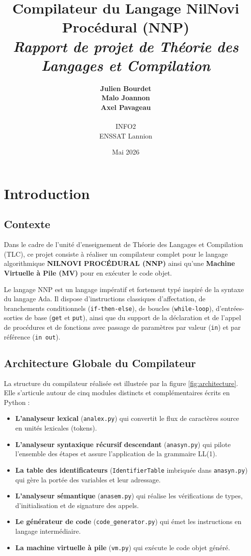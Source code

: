 \documentclass[a4paper, 12pt]{article}
\title{
    \vspace{2cm}
    \Huge\color{navyblue}\textbf{Compilateur du Langage NilNovi Procédural (NNP)}\\
    \vspace{0.5cm}
    \large\color{charcoal}\textit{Rapport de projet de Théorie des Langages et Compilation}\\
    \vspace{1.5cm}
}
\author{
    \textbf{Julien Bourdet}\\
    \textbf{Malo Joannon}\\
    \textbf{Axel Pavageau} \\
    \vspace{1cm}\\
    \color{charcoal}INFO2\\
    \color{charcoal}ENSSAT Lannion\\
}
\date{Mai 2026}
\begin{document}
\maketitle
\thispagestyle{empty}
\newpage

\tableofcontents
\newpage

\section{Introduction}

\subsection{Contexte}
Dans le cadre de l'unité d'enseignement de Théorie des Langages et Compilation (TLC), ce projet consiste à réaliser un compilateur complet pour le langage algorithmique \textbf{NILNOVI PROCÉDURAL (NNP)} ainsi qu'une \textbf{Machine Virtuelle à Pile (MV)} pour en exécuter le code objet. 

Le langage NNP est un langage impératif et fortement typé inspiré de la syntaxe du langage Ada. Il dispose d'instructions classiques d'affectation, de branchements conditionnels (\texttt{if-then-else}), de boucles (\texttt{while-loop}), d'entrées-sorties de base (\texttt{get} et \texttt{put}), ainsi que du support de la déclaration et de l'appel de procédures et de fonctions avec passage de paramètres par valeur (\texttt{in}) et par référence (\texttt{in out}).

\subsection{Architecture Globale du Compilateur}
La structure du compilateur réalisée est illustrée par la figure \ref{fig:architecture}. Elle s'articule autour de cinq modules distincts et complémentaires écrits en Python :
\begin{itemize}
    \item \textbf{L'analyseur lexical} (\texttt{analex.py}) qui convertit le flux de caractères source en unités lexicales (tokens).
    \item \textbf{L'analyseur syntaxique récursif descendant} (\texttt{anasyn.py}) qui pilote l'ensemble des étapes et assure l'application de la grammaire LL(1).
    \item \textbf{La table des identificateurs} (\texttt{IdentifierTable} imbriquée dans \texttt{anasyn.py}) qui gère la portée des variables et leur adressage.
    \item \textbf{L'analyseur sémantique} (\texttt{anasem.py}) qui réalise les vérifications de types, d'initialisation et de signature des appels.
    \item \textbf{Le générateur de code} (\texttt{code\_generator.py}) qui émet les instructions en langage intermédiaire.
    \item \textbf{La machine virtuelle à pile} (\texttt{vm.py}) qui exécute le code objet généré.
\end{itemize}
\end{document}
